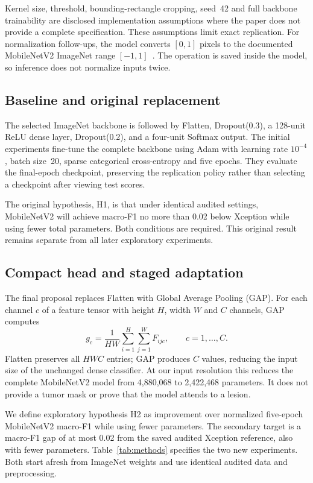 \documentclass[11pt,a4paper]{article}
\begin{document}
Kernel size, threshold, bounding-rectangle cropping, seed~42 and full backbone
trainability are disclosed implementation assumptions where the paper does not
provide a complete specification. These assumptions limit exact replication.
For normalization follow-ups, the model converts $[0,1]$ pixels to the documented
MobileNetV2 ImageNet range $[-1,1]$~\cite{mobilenetpreprocessing}. The operation
is saved inside the model, so inference does not normalize inputs twice.

\subsection{Baseline and original replacement}
The selected ImageNet backbone is followed by Flatten, Dropout(0.3), a
128-unit ReLU dense layer, Dropout(0.2), and a four-unit Softmax output.
The initial experiments fine-tune the complete backbone using Adam with
learning rate $10^{-4}$, batch size~20, sparse categorical cross-entropy and
five epochs. They evaluate the final-epoch checkpoint, preserving the
replication policy rather than selecting a checkpoint after viewing test scores.

The original hypothesis, H1, is that under identical audited settings,
MobileNetV2 will achieve macro-F1 no more than 0.02 below Xception while using
fewer total parameters. Both conditions are required. This original result
remains separate from all later exploratory experiments.

\subsection{Compact head and staged adaptation}
The final proposal replaces Flatten with Global Average Pooling (GAP).
For each channel $c$ of a feature tensor with height $H$, width $W$ and
$C$ channels, GAP computes
\begin{equation}
 g_c=\frac{1}{HW}\sum_{i=1}^{H}\sum_{j=1}^{W} F_{ijc},
 \qquad c=1,\ldots,C.
\end{equation}
Flatten preserves all $HWC$ entries; GAP produces $C$ values, reducing the
input size of the unchanged dense classifier. At our input resolution this
reduces the complete MobileNetV2 model from 4,880,068 to 2,422,468 parameters.
It does not provide a tumor mask or prove that the model attends to a lesion.

We define exploratory hypothesis H2 as improvement over normalized five-epoch
MobileNetV2 macro-F1 while using fewer parameters. The secondary target is a
macro-F1 gap of at most 0.02 from the saved audited Xception reference, also
with fewer parameters. Table~\ref{tab:methods} specifies the two new experiments.
Both start afresh from ImageNet weights and use identical audited data and
preprocessing.
\end{document}
